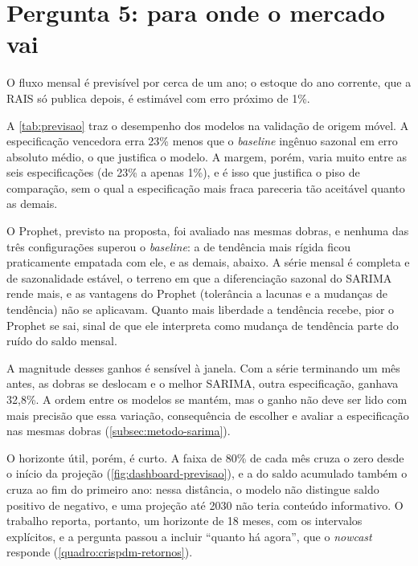 \section{Pergunta 5: para onde o mercado vai}
\label{sec:resultado-q5}

O fluxo mensal é previsível por cerca de um ano; o estoque do ano corrente, que a RAIS só publica depois, é estimável com erro próximo de 1\%.



A \autoref{tab:previsao} traz o desempenho dos modelos na validação de origem móvel. A especificação vencedora erra 23\% menos que o \textit{baseline} ingênuo sazonal em erro absoluto médio, o que justifica o modelo. A margem, porém, varia muito entre as seis especificações (de 23\% a apenas 1\%), e é isso que justifica o piso de comparação, sem o qual a especificação mais fraca pareceria tão aceitável quanto as demais.

O Prophet, previsto na proposta, foi avaliado nas mesmas dobras, e nenhuma das três configurações superou o \textit{baseline}: a de tendência mais rígida ficou praticamente empatada com ele, e as demais, abaixo. A série mensal é completa e de sazonalidade estável, o terreno em que a diferenciação sazonal do SARIMA rende mais, e as vantagens do Prophet (tolerância a lacunas e a mudanças de tendência) não se aplicavam. Quanto mais liberdade a tendência recebe, pior o Prophet se sai, sinal de que ele interpreta como mudança de tendência parte do ruído do saldo mensal.

A magnitude desses ganhos é sensível à janela. Com a série terminando um mês antes, as dobras se deslocam e o melhor SARIMA, outra especificação, ganhava 32,8\%. A ordem entre os modelos se mantém, mas o ganho não deve ser lido com mais precisão que essa variação, consequência de escolher e avaliar a especificação nas mesmas dobras (\autoref{subsec:metodo-sarima}).

O horizonte útil, porém, é curto. A faixa de 80\% de cada mês cruza o zero desde o início da projeção (\autoref{fig:dashboard-previsao}), e a do saldo acumulado também o cruza ao fim do primeiro ano: nessa distância, o modelo não distingue saldo positivo de negativo, e uma projeção até 2030 não teria conteúdo informativo. O trabalho reporta, portanto, um horizonte de 18 meses, com os intervalos explícitos, e a pergunta passou a incluir ``quanto há agora'', que o \textit{nowcast} responde (\autoref{quadro:crispdm-retornos}).

